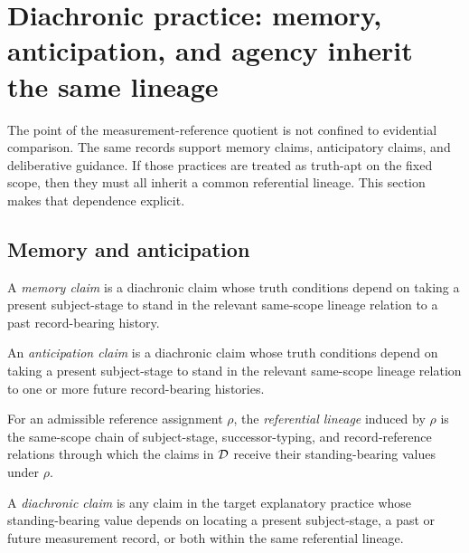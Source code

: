 \section{Diachronic practice: memory, anticipation, and agency inherit the same lineage}
\label{sec:diachronic_practice}

The point of the measurement-reference quotient is not confined to evidential comparison. The same
records support memory claims, anticipatory claims, and deliberative guidance. If those practices are
treated as truth-apt on the fixed scope, then they must all inherit a common referential lineage.
This section makes that dependence explicit.

\subsection{Memory and anticipation}

\begin{definition}
A \emph{memory claim} is a diachronic claim whose truth conditions depend on taking a present
subject-stage to stand in the relevant same-scope lineage relation to a past record-bearing history.
\end{definition}

\begin{definition}
An \emph{anticipation claim} is a diachronic claim whose truth conditions depend on taking a present
subject-stage to stand in the relevant same-scope lineage relation to one or more future
record-bearing histories.
\end{definition}

\begin{definition}
\label{def:referential-lineage}
For an admissible reference assignment $\rho$, the \emph{referential lineage} induced by $\rho$ is the
same-scope chain of subject-stage, successor-typing, and record-reference relations through which the
claims in $\mathcal{D}$ receive their standing-bearing values under $\rho$.
\end{definition}


\begin{definition}
\label{def:diachronic-claim}
A \emph{diachronic claim} is any claim in the target explanatory practice whose standing-bearing value
depends on locating a present subject-stage, a past or future measurement record, or both within the
same referential lineage.
\end{definition}

